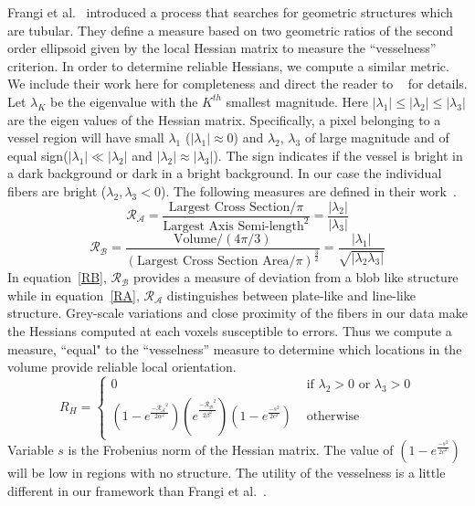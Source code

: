 Frangi et al.~\cite{Frangi1998} introduced a process that searches for geometric structures which are tubular. They define a measure based on two geometric ratios of the second order ellipsoid given by the local Hessian matrix to measure the ``vesselness'' criterion.  In order to determine reliable Hessians, we compute a similar metric. We include their work here for completeness and direct the reader to ~\cite{Frangi1998} for details. Let $\lambda_{K}$ be the eigenvalue with the $K^{th}$ smallest magnitude. Here $|{\lambda}_{1}| \leq| {\lambda}_{2}|\leq| {\lambda}_{3}| $ are the eigen values of the Hessian matrix. Specifically, a pixel belonging to a vessel region will have small $\lambda_{1}$ ($|\lambda_{1}|\approx 0$) and $\lambda_{2}$, $\lambda_{3}$ of large magnitude and of equal sign($|\lambda_{1}| \ll |\lambda_{2}|$ and $|\lambda_{2}|\approx |\lambda_{3}|$). The sign indicates if the vessel is bright in a dark background or dark in a bright background. In our case the individual fibers are bright ($\lambda_2,\lambda_3 < 0$).  The following measures are defined in their work~\cite{Frangi1998}.  
\begin{equation}\label{RA}
\mathcal{R_{A}}=\frac{\textrm{Largest  Cross Section}\big/ \pi}{{\textrm{Largest Axis Semi-length}}^{2}}=\frac{|\lambda_{2}|}{|\lambda_{3}|}
\end{equation}
\begin{equation}\label{RB}
\mathcal{R_{B}}=\frac{\textrm{Volume}\big/ (4\pi \big/ 3)}{{(\textrm{Largest Cross Section Area}\big/ \pi)}^{\frac{3}{2}}}=\frac{|\lambda_{1}|}{\sqrt{|\lambda_{2}\lambda_{3}|}}
\end{equation}
In equation~\ref{RB}, $\mathcal{R_{B}}$ provides a measure of deviation from a blob like structure while in equation~\ref{RA}, $\mathcal{R_{A}}$ distinguishes between plate-like and line-like structure. Grey-scale variations and close proximity of the fibers in our data make the Hessians computed at each voxels susceptible to errors. Thus we compute a measure, ``equal" to the ``vesselness'' measure to determine which locations in the volume provide reliable local orientation.
$$
R_{H} = \left\{ \begin{array}{ccc}
 0 & \mbox{ if $\lambda_{2}>0$ or $\lambda_{3}>0$} \\
  (1-e^{\frac{\mathcal{-R_{A}}^{2}}{2\alpha^{2}}})
  (e^{\frac{\mathcal{-R_{B}}^{2}}{2\beta^{2}}}) (1-e^{\frac{-s^2}{2c^2}}) &\mbox{ otherwise}
       \end{array} \right.
$$
Variable $s$ is the Frobenius norm of the Hessian matrix. The value  of $(1-e^{\frac{-s^2}{2c^2}})$ will be low in regions with no structure. The utility of the vesselness is a little different in our framework than Frangi et al.~\cite{Frangi1998}.
